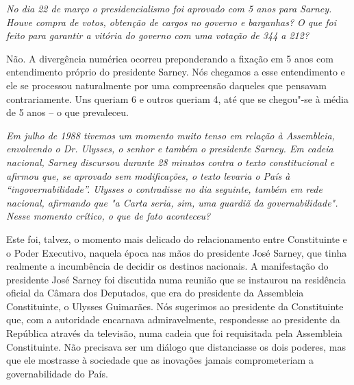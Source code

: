 \medskip

\noindent\emph{No dia 22 de março o presidencialismo foi aprovado com 5 anos
para Sarney. Houve compra de votos, obtenção de cargos no governo e
barganhas? O que foi feito para garantir a vitória do governo com uma
votação de 344 a 212?}

Não. A divergência numérica ocorreu preponderando a
fixação em 5 anos com entendimento próprio do presidente Sarney. Nós
chegamos a esse entendimento e ele se processou naturalmente por uma
compreensão daqueles que pensavam contrariamente. Uns queriam 6 e outros
queriam 4, até que se chegou"-se à média de 5 anos -- o que prevaleceu.

\medskip

\noindent\emph{Em julho de 1988 tivemos um momento muito tenso em relação à
Assembleia, envolvendo o Dr. Ulysses, o senhor e também o presidente
Sarney. Em cadeia nacional, Sarney discursou durante 28 minutos contra o
texto constitucional e afirmou que, se aprovado sem modificações, o
texto levaria o País à ``ingovernabilidade''. Ulysses o contradisse no
dia seguinte, também em rede nacional, afirmando que "a Carta seria,
sim, uma guardiã da governabilidade". Nesse momento crítico, o que de
fato aconteceu?}

Este foi, talvez, o momento mais delicado do
relacionamento entre Constituinte e o Poder Executivo, naquela época nas
mãos do presidente José Sarney, que tinha realmente a incumbência de
decidir os destinos nacionais. A manifestação do presidente José Sarney
foi discutida numa reunião que se instaurou na residência oficial da
Câmara dos Deputados, que era do presidente da Assembleia Constituinte,
o Ulysses Guimarães. Nós sugerimos ao presidente da Constituinte que,
com a autoridade encarnava admiravelmente, respondesse ao presidente da
República através da televisão, numa cadeia que foi requisitada pela
Assembleia Constituinte. Não precisava ser um diálogo que distanciasse
os dois poderes, mas que ele mostrasse à sociedade que as inovações
jamais comprometeriam a governabilidade do País.

